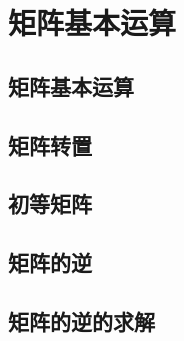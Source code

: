 \chapter{矩阵基本运算}

\section{矩阵基本运算}

\section{矩阵转置}

\section{初等矩阵}

\section{矩阵的逆}

\section{矩阵的逆的求解}
